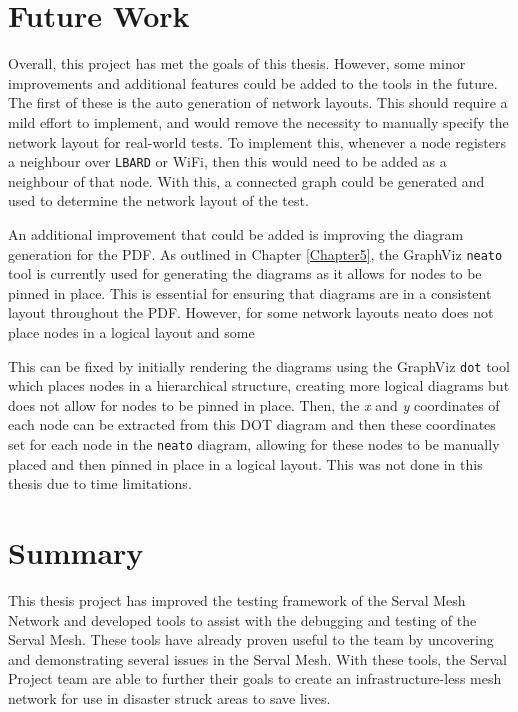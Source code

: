 \section{Future Work}
\label{section:futureWork}
Overall, this project has met the goals of this thesis.
However, some minor improvements and additional features could be added to the tools in the future.
The first of these is the auto generation of network layouts.
This should require a mild effort to implement, and would remove the necessity to manually specify the network layout for real-world tests.
To implement this, whenever a node registers a neighbour over \texttt{LBARD} or WiFi, then this would need to be added as a neighbour of that node.
With this, a connected graph could be generated and used to determine the network layout of the test.

An additional improvement that could be added is improving the diagram generation for the PDF.
As outlined in Chapter \ref{Chapter5}, the GraphViz \texttt{neato} tool is currently used for generating the diagrams as it allows for nodes to be pinned in place. 
This is essential for ensuring that diagrams are in a consistent layout throughout the PDF. 
However, for some network layouts neato does not place nodes in a logical layout and some 

This can be fixed by initially rendering the diagrams using the GraphViz \texttt{dot} tool which places nodes in a hierarchical structure, creating more logical diagrams but does not allow for nodes to be pinned in place.
Then, the \emph{x} and \emph{y} coordinates of each node can be extracted from this DOT diagram and then these coordinates set for each node in the \texttt{neato} diagram, allowing for these nodes to be manually placed and then pinned in place in a logical layout.
This was not done in this thesis due to time limitations.

\pagebreak
\section{Summary}
This thesis project has improved the testing framework of the Serval Mesh Network and developed tools to assist with the debugging and testing of the Serval Mesh.
These tools have already proven useful to the team by uncovering and demonstrating several issues in the Serval Mesh.
With these tools, the Serval Project team are able to further their goals to create an infrastructure-less mesh network for use in disaster struck areas to save lives.